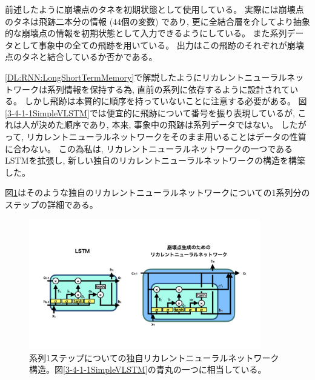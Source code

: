 前述したように崩壊点のタネを初期状態として使用している。
実際には崩壊点のタネは飛跡二本分の情報 ($44$個の変数) であり, 更に全結合層を介してより抽象的な崩壊点の情報を初期状態として入力できるようにしている。
また系列データとして事象中の全ての飛跡を用いている。
出力はこの飛跡のそれぞれが崩壊点のタネと結合しているか否かである。

\ref{DL:RNN:LongShortTermMemory}で解説したようにリカレントニューラルネットワークは系列情報を保持する為, 直前の系列に依存するように設計されている。
しかし飛跡は本質的に順序を持っていないことに注意する必要がある。
図\ref{3-4-1-1SimpleVLSTM}では便宜的に飛跡について番号を振り表現しているが, これは人が決めた順序であり, 本来, 事象中の飛跡は系列データではない。
したがって, リカレントニューラルネットワークをそのまま用いることはデータの性質に合わない。
この為私は, リカレントニューラルネットワークの一つであるLSTMを拡張し, 新しい独自のリカレントニューラルネットワークの構造を構築した。

図\ref{3-4-1-2VLSTMStructure}はそのような独自のリカレントニューラルネットワークについての1系列分のステップの詳細である。

\begin{figure}[htbp]
 \centering
 \includegraphics[trim = 0 100 0 200, width=0.9\textwidth, clip]{Figure/3Networks/3-4-1-2VLSTMStructure.png}
 \caption[系列1ステップについての独自リカレントニューラルネットワーク構造]{系列1ステップについての独自リカレントニューラルネットワーク構造。図\ref{3-4-1-1SimpleVLSTM}の青丸の一つに相当している。}
 \label{3-4-1-2VLSTMStructure}
\end{figure}


